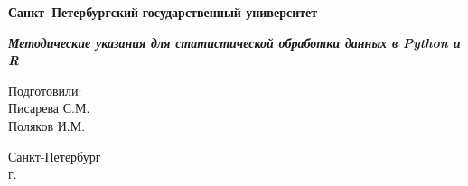 \begin{titlepage}
	\begin{center}
		\textbf{Санкт--Петербургский}
		\textbf{государственный университет}
		
		\vspace{60mm}
		
		\textbf{\textit{\large Методические указания для статистической обработки данных в Python и R}} \\[8mm]
		
		\vspace{70mm}	
		
		\begin{flushright}
			Подготовили: \\
			Писарева С.М. \\
			Поляков И.М.
		\end{flushright}
		
		\vfill 
		
		{Санкт-Петербург}\\
		\the\year{} г.
	\end{center}
\end{titlepage}

